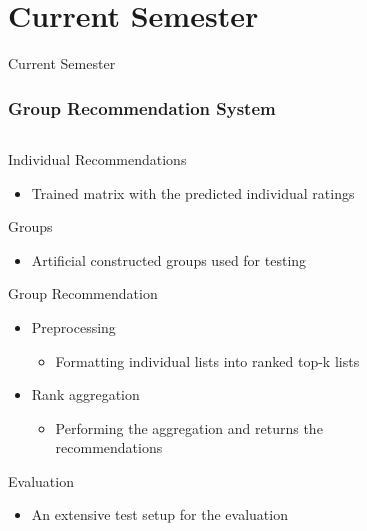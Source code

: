 \section{Current Semester}
\begin{frame}
     \begin{center}
     	\huge Current Semester
     \end{center}
\end{frame}

\begin{frame}
\frametitle{Group Recommendation System}
\begin{columns}
	\begin{column}{0.55\textwidth}
		Individual Recommendations
		\begin{itemize}
			\small
			\item Trained matrix with the predicted individual ratings
			\normalsize
		\end{itemize}
		Groups
		\begin{itemize}
			\small
			\item Artificial constructed groups used for testing
			\normalsize
		\end{itemize}
		Group Recommendation
		\begin{itemize}
			\item Preprocessing 
			\begin{itemize}
				\item Formatting individual lists into ranked top-k lists
			\end{itemize}
			\item Rank aggregation 
			\begin{itemize}
				\item Performing the aggregation and returns the recommendations
			\end{itemize}
		\end{itemize}
		Evaluation
		\begin{itemize}
			\small
			\item An extensive test setup for the evaluation
			\normalsize
		\end{itemize}
	\end{column}
	\begin{column}{0.45\textwidth}
		\vspace{-0.3cm}
		\begin{figure}
			\centering

\end{figure}
\end{column}
\end{columns}
\end{frame}
